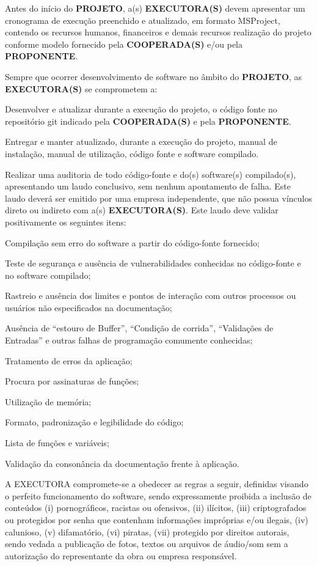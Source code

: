 \xx Antes do início do \textbf{PROJETO}, a(s) \textbf{EXECUTORA(S)} devem apresentar um cronograma de execução preenchido e atualizado, em formato MSProject, contendo os recursos humanos, financeiros e demais recursos realização do projeto conforme modelo fornecido pela \textbf{COOPERADA(S)} e/ou pela \textbf{PROPONENTE}.

\xx Sempre que ocorrer desenvolvimento de software no âmbito do \textbf{PROJETO}, as \textbf{EXECUTORA(S)} se comprometem a:

\xxx  Desenvolver e atualizar durante a execução do projeto, o código fonte no repositório git indicado pela \textbf{COOPERADA(S)} e pela \textbf{PROPONENTE}.

\xxx  Entregar e manter atualizado, durante a execução do projeto, manual de instalação, manual de utilização, código fonte e software compilado.

\xxx  Realizar uma auditoria de todo código-fonte e do(s) software(s) compilado(s), apresentando um laudo conclusivo, sem nenhum apontamento de falha. Este laudo deverá ser emitido por uma empresa independente, que não possua vínculos direto ou indireto com a(s) \textbf{EXECUTORA(S)}. Este laudo deve validar positivamente os seguintes itens:

\xxxx Compilação sem erro do software a partir do código-fonte fornecido;

\xxxx Teste de segurança e ausência de vulnerabilidades conhecidas no código-fonte e no software compilado;

\xxxx Rastreio e ausência dos limites e pontos de interação com outros processos ou usuários não especificados na documentação;

\xxxx Ausência de “estouro de Buffer”, “Condição de corrida”, “Validações de Entradas” e outras falhas de programação comumente conhecidas;

\xxxx Tratamento de erros da aplicação;

\xxxx Procura por assinaturas de funções;

\xxxx Utilização de memória;

\xxxx Formato, padronização e legibilidade do código;

\xxxx Lista de funções e variáveis;

\xxxx Validação da consonância da documentação frente à aplicação.

\xx A EXECUTORA compromete-se a obedecer as regras a seguir, definidas visando o perfeito funcionamento do software, sendo expressamente proibida a inclusão de conteúdos (i) pornográficos, racistas ou ofensivos, (ii) ilícitos, (iii) criptografados ou protegidos por senha que contenham informações impróprias e/ou ilegais, (iv) calunioso, (v) difamatório, (vi) piratas, (vii) protegido por direitos autorais, sendo vedada a publicação de fotos, textos ou arquivos de áudio/som sem a autorização do representante da obra ou empresa responsável.

